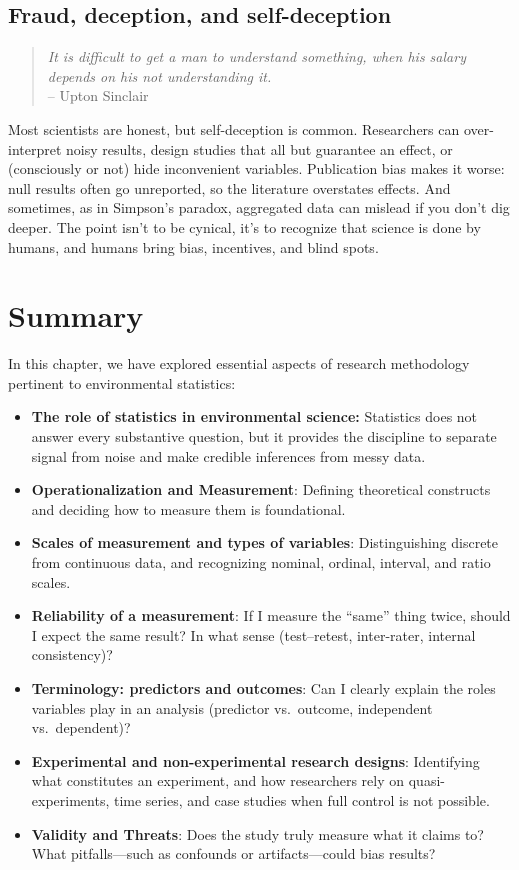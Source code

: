 \documentclass[
  letterpaper,
  DIV=11,
  numbers=noendperiod]{scrreprt}
\begin{document}
\subsection{Fraud, deception, and
self-deception}\label{fraud-deception-and-self-deception}

\begin{quote}
\emph{It is difficult to get a man to understand something, when his
salary depends on his not understanding it.}\\
-- Upton Sinclair
\end{quote}

Most scientists are honest, but self-deception is common. Researchers
can over-interpret noisy results, design studies that all but guarantee
an effect, or (consciously or not) hide inconvenient variables.
Publication bias makes it worse: null results often go unreported, so
the literature overstates effects. And sometimes, as in Simpson's
paradox, aggregated data can mislead if you don't dig deeper. The point
isn't to be cynical, it's to recognize that science is done by humans,
and humans bring bias, incentives, and blind spots.

\section{Summary}\label{summary}

In this chapter, we have explored essential aspects of research
methodology pertinent to environmental statistics:

\begin{itemize}
\item
  \textbf{The role of statistics in environmental science:} Statistics
  does not answer every substantive question, but it provides the
  discipline to separate signal from noise and make credible inferences
  from messy data.
\item
  \textbf{Operationalization and Measurement}: Defining theoretical
  constructs and deciding how to measure them is foundational.
\item
  \textbf{Scales of measurement and types of variables}: Distinguishing
  discrete from continuous data, and recognizing nominal, ordinal,
  interval, and ratio scales.
\item
  \textbf{Reliability of a measurement}: If I measure the ``same'' thing
  twice, should I expect the same result? In what sense (test--retest,
  inter-rater, internal consistency)?
\item
  \textbf{Terminology: predictors and outcomes}: Can I clearly explain
  the roles variables play in an analysis (predictor vs.~outcome,
  independent vs.~dependent)?
\item
  \textbf{Experimental and non-experimental research designs}:
  Identifying what constitutes an experiment, and how researchers rely
  on quasi-experiments, time series, and case studies when full control
  is not possible.
\item
  \textbf{Validity and Threats}: Does the study truly measure what it
  claims to? What pitfalls---such as confounds or artifacts---could bias
  results?
\end{itemize}
\end{document}
